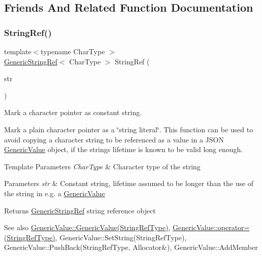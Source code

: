 \subsection{Friends And Related Function Documentation}
\mbox{\label{a02008_aa6b9fd9f6aa49405a574c362ba9af6b5}} 
\subsubsection{\texorpdfstring{String\+Ref()}{StringRef()}\hspace{0.1cm}{\footnotesize\ttfamily [1/2]}}
{\footnotesize\ttfamily template$<$typename Char\+Type $>$ \\
\hyperlink{a02008}{Generic\+String\+Ref}$<$ Char\+Type $>$ String\+Ref (\begin{DoxyParamCaption}\item[{const Char\+Type $\ast$}]{str }\end{DoxyParamCaption})\hspace{0.3cm}{\ttfamily [related]}}



Mark a character pointer as constant string. 

Mark a plain character pointer as a \char`\"{}string literal\char`\"{}. This function can be used to avoid copying a character string to be referenced as a value in a J\+S\+ON \hyperlink{a01992}{Generic\+Value} object, if the string\textquotesingle{}s lifetime is known to be valid long enough. 
\begin{DoxyTemplParams}{Template Parameters}
{\em Char\+Type} & Character type of the string \\
\hline
\end{DoxyTemplParams}

\begin{DoxyParams}{Parameters}
{\em str} & Constant string, lifetime assumed to be longer than the use of the string in e.\+g. a \hyperlink{a01992}{Generic\+Value} \\
\hline
\end{DoxyParams}
\begin{DoxyReturn}{Returns}
\hyperlink{a02008}{Generic\+String\+Ref} string reference object
\end{DoxyReturn}
\begin{DoxySeeAlso}{See also}
\hyperlink{a01992_abb2887958974fef1b2b5c8e32cc72ddb}{Generic\+Value\+::\+Generic\+Value(\+String\+Ref\+Type)}, \hyperlink{a01992_a386708557555e6389184de608af5e6a6}{Generic\+Value\+::operator=(\+String\+Ref\+Type)}, Generic\+Value\+::\+Set\+String(\+String\+Ref\+Type), Generic\+Value\+::\+Push\+Back(\+String\+Ref\+Type, Allocator\&), Generic\+Value\+::\+Add\+Member 
\end{DoxySeeAlso}
\mbox{\label{a02008_a578c51ab574a50a9c760b9da7c7562f2}} 
